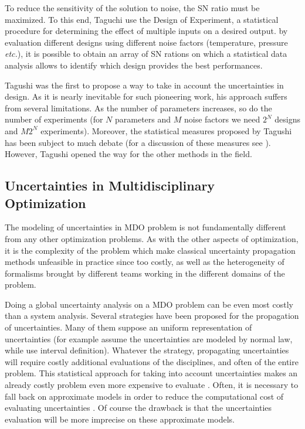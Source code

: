 To reduce the sensitivity of the solution to noise, the SN ratio must be maximized. To this end, Taguchi use the Design of Experiment\cite{sacks1989design}, a statistical procedure for determining the effect of multiple inputs on a desired output. by evaluation different designs using different noise factors (temperature, pressure \emph{etc.}), it is possible to obtain an array of SN rations on which a statistical data analysis allows to identify which design provides the best performances.

Tagushi was the first to propose a way to take in account the uncertainties in design. As it is nearly inevitable for such pioneering work, his approach suffers from several limitations. As the number of parameters increases, so do the number of experiments (for $N$ parameters and $M$ noise factors we need $2^N$ designs and $M2^N$ experiments). Moreover, the statistical measures proposed by Tagushi has been subject to much debate (for a discussion of these measures see \cite{nair1992taguchi}). However, Tagushi opened the way for the other methods in the field.

\subsection{Uncertainties in Multidisciplinary Optimization}

The modeling of uncertainties in MDO problem is not fundamentally different from any other optimization problems. As with the other aspects of optimization, it is the complexity of the problem which make classical uncertainty propagation methods unfeasible in practice since too costly, as well as the heterogeneity of formalisms brought by different teams working in the different domains of the problem.

Doing a global uncertainty analysis on a MDO problem can be even most costly than a system analysis. Several strategies have been proposed for the propagation of uncertainties. Many of them suppose an uniform representation of uncertainties (for example \cite{du2005collaborative,liu2006probabilistic} assume the uncertainties are modeled by normal law, while \cite{gu2000worst,li2008multiobjective} use interval definition). Whatever the strategy, propagating uncertainties will require costly additional evaluations of the disciplines, and often of the entire problem. This statistical approach for taking into account uncertainties makes an already costly problem even more expensive to evaluate \cite{koch1999statistical}. Often, it is necessary to fall back on approximate models in order to reduce the computational cost of evaluating uncertainties \cite{allen2006robust}. Of course the drawback is that the uncertainties evaluation will be more imprecise on these approximate models.



